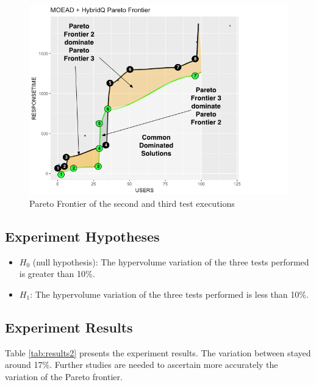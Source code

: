 \documentclass[espaco=umemeio,chapter=TITLE,twoside,openright]{abnt}
\begin{document}
\begin{figure}[h]
\centering
\includegraphics[width=1\textwidth]{./images/comparative2.png}
    \caption{Pareto Frontier of the second and third test executions}
\label{fig:comp2}
\end{figure}

\subsection{Experiment Hypotheses}


\begin{itemize}
\item $H_{0}$  (null hypothesis): The hypervolume variation of the three tests performed is greater than 10\%.
\item $H_{1}$: The hypervolume variation of the three tests performed is less than 10\%.
\end{itemize}


\subsection{Experiment Results}

Table \ref{tab:results2} presents the experiment results. The variation between stayed around 17\%. Further studies are needed to ascertain more accurately the variation of the Pareto frontier.
\end{document}
